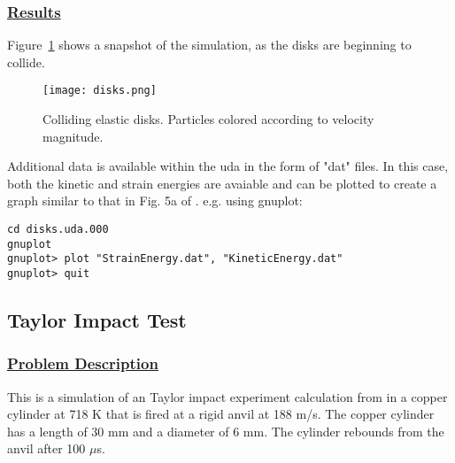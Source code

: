 \subsubsection*{\underline{Results}}

Figure~\ref{figdisks} shows a snapshot of the simulation, as the disks
are beginning to collide.
\begin{figure}
  \center
  \texttt{[image: disks.png]}
  \caption{Colliding elastic disks.  Particles colored according to
velocity magnitude.}
  \label{figdisks}
\end{figure}

Additional data is available within the uda in the form of "dat" files.
In this case, both the kinetic and strain energies are avaiable and can
be plotted to create a graph similar to that in Fig. 5a of \cite{sulskycmame}.
e.g. using gnuplot:

\begin{Verbatim}[fontsize=\footnotesize]
cd disks.uda.000
gnuplot
gnuplot> plot "StrainEnergy.dat", "KineticEnergy.dat"
gnuplot> quit
\end{Verbatim}
%
\subsection*{\center Taylor Impact Test}
\subsubsection*{\underline{Problem Description}}
This is a simulation of an Taylor impact experiment calculation from 
\cite{Gust82} in a copper cylinder at 718 K that is fired at a
rigid anvil at 188 m/s.  The copper cylinder has a length of 30 mm and
a diameter of 6 mm.  The cylinder rebounds from the anvil after 100 $\mu$s.
 
